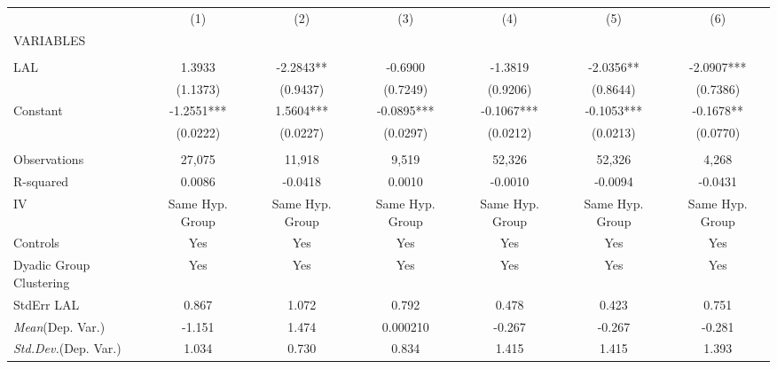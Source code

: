 \documentclass[]{article}
\begin{document}
\begin{tabular}{lcccccc} \hline
 & (1) & (2) & (3) & (4) & (5) & (6) \\
VARIABLES &  &  &  &  &  &  \\ \hline
 &  &  &  &  &  &  \\
LAL & 1.3933 & -2.2843** & -0.6900 & -1.3819 & -2.0356** & -2.0907*** \\
 & (1.1373) & (0.9437) & (0.7249) & (0.9206) & (0.8644) & (0.7386) \\
Constant & -1.2551*** & 1.5604*** & -0.0895*** & -0.1067*** & -0.1053*** & -0.1678** \\
 & (0.0222) & (0.0227) & (0.0297) & (0.0212) & (0.0213) & (0.0770) \\
 &  &  &  &  &  &  \\
Observations & 27,075 & 11,918 & 9,519 & 52,326 & 52,326 & 4,268 \\
R-squared & 0.0086 & -0.0418 & 0.0010 & -0.0010 & -0.0094 & -0.0431 \\
IV & Same Hyp. Group & Same Hyp. Group & Same Hyp. Group & Same Hyp. Group & Same Hyp. Group & Same Hyp. Group \\
Controls & Yes & Yes & Yes & Yes & Yes & Yes \\
Dyadic Group Clustering & Yes & Yes & Yes & Yes & Yes & Yes \\
StdErr LAL & 0.867 & 1.072 & 0.792 & 0.478 & 0.423 & 0.751 \\
\textit{Mean}(Dep. Var.) & -1.151 & 1.474 & 0.000210 & -0.267 & -0.267 & -0.281 \\
 \textit{Std.Dev.}(Dep. Var.) & 1.034 & 0.730 & 0.834 & 1.415 & 1.415 & 1.393 \\ \hline
\end{tabular}
\end{document}
